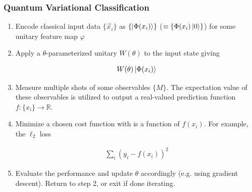\documentclass{beamer}
\newcommand\0{\mathbf{0}}
\newcommand\RR{\mathbb{R}}
\newcommand\<{\langle}
\renewcommand\>{\rangle}
\renewcommand\phi{\varphi}
\begin{document}
 
 \begin{frame}
\frametitle{Quantum Variational Classification}
\begin{enumerate}
\item Encode classical input data $\{\vec{x}_i \}$ as $\{\ket{\Phi(x_i)} \}$ ($\equiv \{\Phi(x_i)\ket{0} \}$) for some unitary feature map $\phi$

\item Apply a $\theta$-parameterized unitary $W(\theta)$ to the input state giving

\begin{align*}
W(\theta)\ket{\Phi(x_i)}
\end{align*}

\item Measure multiple shots of some observables $\{M\}$. The expectation value of these observables is utilized to output a real-valued prediction function $f : \{x_i\} \rightarrow \RR$.

\item Minimize a chosen cost function with is a function of $f(x_i)$. For example, the $\ell_2$ loss

\begin{align*}
\sum_i (y_i - f(x_i))^2	
\end{align*}

\item Evaluate the performance and update $\theta$ accordingly (e.g. using gradient descent). Return to step 2, or exit if done iterating.

\end{enumerate}
\end{frame}
\end{document}
